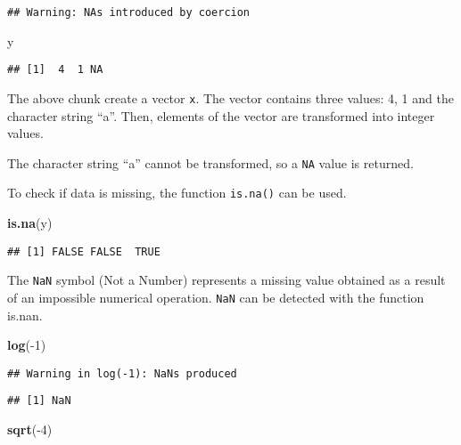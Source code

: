 \documentclass[]{book}
\newenvironment{Shaded}{\begin{snugshade}}{\end{snugshade}}
\newcommand{\KeywordTok}[1]{\textcolor[rgb]{0.13,0.29,0.53}{\textbf{{#1}}}}
\newcommand{\DecValTok}[1]{\textcolor[rgb]{0.00,0.00,0.81}{{#1}}}
\newcommand{\NormalTok}[1]{{#1}}
\begin{document}
\begin{verbatim}
## Warning: NAs introduced by coercion
\end{verbatim}

\begin{Shaded}
\begin{Highlighting}[]
\NormalTok{y}
\end{Highlighting}
\end{Shaded}

\begin{verbatim}
## [1]  4  1 NA
\end{verbatim}

The above chunk create a vector \texttt{x}. The vector contains three
values: 4, 1 and the character string ``a''. Then, elements of the
vector are transformed into integer values.

The character string ``a'' cannot be transformed, so a \texttt{NA} value
is returned.

To check if data is missing, the function \texttt{is.na()} can be used.

\begin{Shaded}
\begin{Highlighting}[]
\KeywordTok{is.na}\NormalTok{(y)}
\end{Highlighting}
\end{Shaded}

\begin{verbatim}
## [1] FALSE FALSE  TRUE
\end{verbatim}

The \texttt{NaN} symbol (Not a Number) represents a missing value
obtained as a result of an impossible numerical operation. \texttt{NaN}
can be detected with the function is.nan.

\begin{Shaded}
\begin{Highlighting}[]
\KeywordTok{log}\NormalTok{(-}\DecValTok{1}\NormalTok{)}
\end{Highlighting}
\end{Shaded}

\begin{verbatim}
## Warning in log(-1): NaNs produced
\end{verbatim}

\begin{verbatim}
## [1] NaN
\end{verbatim}

\begin{Shaded}
\begin{Highlighting}[]
\KeywordTok{sqrt}\NormalTok{(-}\DecValTok{4}\NormalTok{)}
\end{Highlighting}
\end{Shaded}
\end{document}
